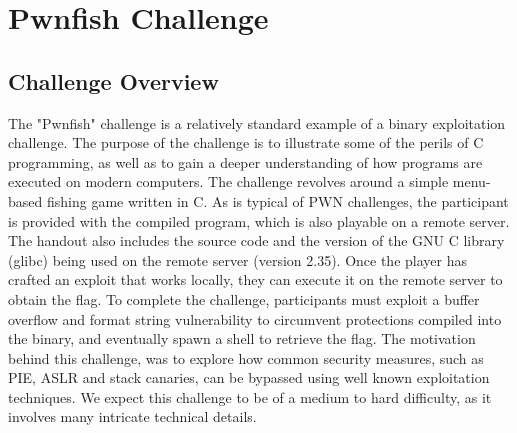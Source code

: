 \section{Pwnfish Challenge}\label{sec:pwn-challenge}

\subsection{Challenge Overview}


The "Pwnfish" challenge is a relatively standard example of a binary exploitation challenge. The purpose of the challenge is to illustrate some of the perils of C programming, as well as to gain a deeper understanding of how programs are executed on modern computers. %
The challenge revolves around a simple menu-based fishing game written in C. 
As is typical of PWN challenges, the participant is provided with the compiled  program, which is also playable on a remote server. The handout also includes the source code and the version of the GNU C library (glibc)\cite{glibc} being used on the remote server (version 2.35). Once the player has crafted an exploit that works locally, they can execute it on the remote server to obtain the flag. 
To complete the challenge, participants must exploit a buffer overflow and format string vulnerability to circumvent protections compiled into the binary, and eventually spawn a shell to retrieve the flag.
The motivation behind this challenge, was to explore how common security measures, such as PIE, ASLR and stack canaries, can be bypassed using well known exploitation techniques. We expect this challenge to be of a medium to hard difficulty, as it involves many intricate technical details.

